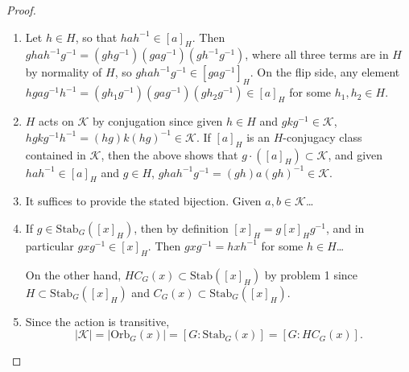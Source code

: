 \documentclass[12pt]{article}
\theoremstyle{definition}
\begin{document}
\begin{proof}\
	\begin{enumerate}[label=(\alph*)]
		\item Let $h \in H$, so that $hah^{-1} \in [a]_H$.
		      Then $ghah^{-1}g^{-1} = (ghg^{-1})(gag^{-1})(gh^{-1}g^{-1})$, where all three terms are in $H$ by normality of $H$, so $ghah^{-1}g^{-1} \in [gag^{-1}]_H$.
		      On the flip side, any element $hgag^{-1}h^{-1} = (gh_1g^{-1})(gag^{-1})(gh_2g^{-1}) \in [a]_H$ for some $h_1,h_2 \in H$.
		\item $H$ acts on $\mathcal{K}$ by conjugation since given $h \in H$ and $gkg^{-1} \in \mathcal{K}$, $hgkg^{-1}h^{-1} = (hg)k(hg)^{-1} \in \mathcal{K}$.
		      If $[a]_H$ is an $H$-conjugacy class contained in $\mathcal{K}$, then the above shows that $g \cdot ([a]_H) \subset \mathcal{K}$, and given $hah^{-1} \in [a]_H$ and $g \in H$, $ghah^{-1}g^{-1} = (gh)a(gh)^{-1} \in \mathcal{K}$.
		\item It suffices to provide the stated bijection.
		      Given $a, b \in \mathcal{K}$\dots
		\item If $g \in \mathrm{Stab}_G([x]_H)$, then by definition $[x]_H = g[x]_Hg^{-1}$, and in particular $gxg^{-1} \in [x]_H$.
		      Then $gxg^{-1} = hxh^{-1}$ for some $h \in H$\dots

		      On the other hand, $HC_G(x) \subset \mathrm{Stab}([x]_H)$ by problem 1 since $H \subset \mathrm{Stab}_G([x]_H)$ and $C_G(x) \subset \mathrm{Stab}_G([x]_H)$.
		\item Since the action is transitive, \begin{equation*}
			      |\mathcal{K}| = |\mathrm{Orb}_G(x)| = [G : \mathrm{Stab}_G(x)] = [G : HC_G(x)].
		      \end{equation*}
	\end{enumerate}
\end{proof}
\end{document}
